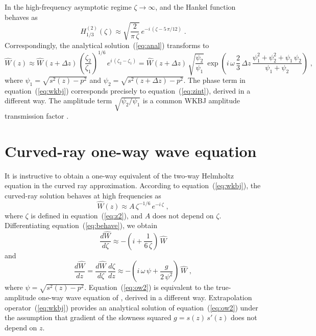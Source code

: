 In the high-frequency asymptotic regime $\zeta \rightarrow \infty$, and 
the Hankel function behaves as \cite[]{watson}
\begin{equation}
  \label{eq:asymp}
  H_{1/3}^{(2)}(\zeta) \approx \sqrt{\frac{2}{\pi\,\zeta}}\,
  e^{-i\,(\zeta - 5\,\pi/12)}\;.
\end{equation}
Correspondingly, the analytical solution~(\ref{eq:anal}) transforms
to
\begin{equation}
  \label{eq:wkbj}
  \widehat{W}(z) \approx \widehat{W}(z+\Delta z)\,\left(\frac{\zeta_2}{\zeta_1}\right)^{1/6}\,
  e^{i\,(\zeta_2 - \zeta_1)}
  = \widehat{W}(z+\Delta z)\,\sqrt{\frac{\psi_2}{\psi_1}}\,
  \exp{\left(i\,\omega\,\frac{2}{3}\,\Delta z\,
      \frac{\psi_1^2+\psi_2^2+\psi_1\,\psi_2}{\psi_1+\psi_2}\right)}
  \;,
\end{equation}
where $\psi_1 = \sqrt{s^2(z)-p^2}$ and $\psi_2 = \sqrt{s^2(z+\Delta
  z)-p^2}$. The phase term in equation~(\ref{eq:wkbj}) corresponds
precisely to equation~(\ref{eq:zint}), derived in a different way. The
amplitude term $\sqrt{\psi_2/\psi_1}$ is a common WKBJ amplitude transmission
factor \cite[]{stolt}.

\newpage


\section{Curved-ray one-way wave equation}

It is instructive to obtain a one-way equivalent of the two-way Helmholtz
equation in the curved ray approximation. According to
equation~(\ref{eq:wkbj}), the curved-ray solution behaves at high frequencies
as
\begin{equation}
  \label{eq:behave}
  \widehat{W}(z) \approx A\,\zeta^{-1/6}\,e^{-i\,\zeta}\;,
\end{equation}
where $\zeta$ is defined in equation~(\ref{eq:z2}), and $A$ does not depend on
$\zeta$. Differentiating equation~(\ref{eq:behave}), we obtain
\begin{equation}
  \label{eq:ow1}
  \frac{d \widehat{W}}{d \zeta} \approx 
  - \left(i + \frac{1}{6\,\zeta}\right)\,\widehat{W}
\end{equation}
and
\begin{equation}
  \label{eq:ow2}
  \frac{d \widehat{W}}{d z} = 
\frac{d \widehat{W}}{d \zeta}\,\frac{d \zeta}{d z}
\approx 
  - \left(i\,\omega\,\psi + \frac{g}{2\,\psi^2}\right)\,
  \widehat{W}\;,
\end{equation}
where $\psi = \sqrt{s^2(z)-p^2}$. Equation~(\ref{eq:ow2}) is
equivalent to the true-amplitude one-way wave equation of
\cite[]{SEG-2003-09250928}, derived in a different way. Extrapolation
operator~(\ref{eq:wkbj}) provides an analytical solution of
equation~(\ref{eq:ow2}) under the assumption that gradient of the
slowness squared $g=s(z)\,s'(z)$ does not depend on $z$.


